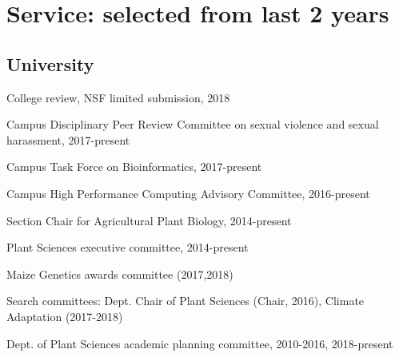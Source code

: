 \documentclass[letterpaper,10pt]{article}
\renewenvironment{itemize}{
  \begin{list}{}{
    \setlength{\leftmargin}{1.5em}
  }
}{
  \end{list}
}
\begin{document}
\section*{Service: selected from last 2 years}
\begin{itemize}
\setlength\itemsep{0ex}
\subsection*{University}
\item College review, NSF limited submission, 2018
\item Campus Disciplinary Peer Review Committee on sexual violence and sexual harassment, 2017-present
\item Campus Task Force on Bioinformatics, 2017-present
\item Campus High Performance Computing Advisory Committee, 2016-present
\item Section Chair for Agricultural Plant Biology, 2014-present
\item Plant Sciences executive committee, 2014-present
\item Maize Genetics awards committee (2017,2018)
\item Search committees: Dept. Chair of Plant Sciences (Chair, 2016), Climate Adaptation (2017-2018)
\item Dept. of Plant Sciences academic planning committee, 2010-2016, 2018-present


\end{itemize}
\end{document}
